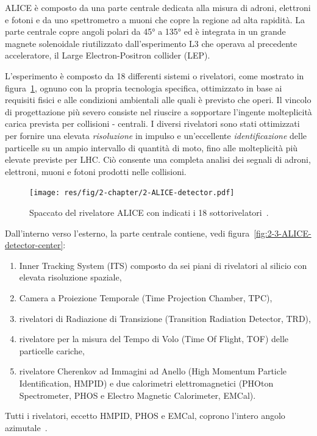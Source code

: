    ALICE è composto da una parte centrale dedicata alla misura di adroni, elettroni e fotoni e da uno spettrometro a muoni che copre la regione ad alta rapidità. La parte centrale copre angoli polari da \ang{45} a \ang{135} ed è integrata in un grande magnete solenoidale riutilizzato dall’esperimento L3 che operava al precedente acceleratore, il Large Electron-Positron collider (LEP).
    
    L’esperimento è composto da 18 differenti sistemi o rivelatori, come mostrato in figura~\ref{fig:2-2-ALICE-detector}, ognuno con la propria tecnologia specifica, ottimizzato in base ai requisiti fisici e alle condizioni ambientali alle quali è previsto che operi. Il vincolo di progettazione più severo consiste nel riuscire a sopportare l’ingente molteplicità carica prevista per collisioni - centrali. I diversi rivelatori sono stati ottimizzati per fornire una elevata \textit{risoluzione} in impulso e un’eccellente \textit{identificazione} delle particelle su un ampio intervallo di quantità di moto, fino alle molteplicità più elevate previste per LHC. Ciò consente una completa analisi dei segnali di adroni, elettroni, muoni e fotoni prodotti nelle collisioni.

    \begin{figure}[t]
        \centering
        \texttt{[image: res/fig/2-chapter/2-ALICE-detector.pdf]}
        \caption{Spaccato del rivelatore ALICE con indicati i 18 sottorivelatori~\cite{Tauro_2017}.}
        \label{fig:2-2-ALICE-detector}
    \end{figure}
    
    Dall’interno verso l’esterno, la parte centrale contiene, vedi figura~\ref{fig:2-3-ALICE-detector-center}:
    \begin{enumerate}
        \item Inner Tracking System (ITS) composto da sei piani di rivelatori al silicio con elevata risoluzione spaziale,

        \item Camera a Proiezione Temporale (Time Projection Chamber, TPC),
        
        \item rivelatori di Radiazione di Transizione (Transition Radiation Detector, TRD),

        \item rivelatore per la misura del Tempo di Volo (Time Of Flight, TOF) delle particelle cariche,

        \item rivelatore Cherenkov ad Immagini ad Anello (High Momentum Particle Identification, HMPID) e due calorimetri elettromagnetici (PHOton Spectrometer, PHOS e Electro Magnetic Calorimeter, EMCal).
    \end{enumerate}
    Tutti i rivelatori, eccetto HMPID, PHOS e EMCal, coprono l’intero angolo azimutale~\cite{ALICE_2008}.

